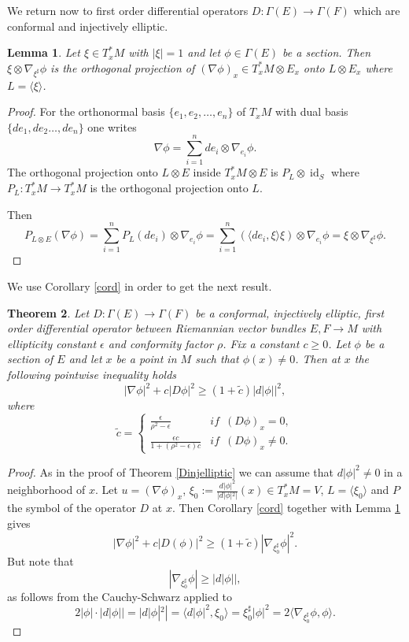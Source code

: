 \documentclass[12pt]{amsart} %
\newtheorem{theorem}{Theorem}[section]
\newtheorem{lemma}[theorem]{Lemma}
\theoremstyle{definition}
\numberwithin{equation}{section}
\DeclareMathOperator{\id}{id}
\newcommand{\ra}{\rightarrow}
\begin{document}
We return now to first order differential operators $D:\Gamma(E)\ra \Gamma(F)$ which are conformal and injectively elliptic.  
\begin{lemma} \label{cord2} Let $\xi\in T^*_xM$ with $|\xi|=1$ and let $\phi\in \Gamma(E)$ be a section. Then $\xi\otimes \nabla_{\xi^{\sharp}}\phi$ is the orthogonal projection of $(\nabla \phi)_x\in T^ *_xM\otimes E_x$ onto $L\otimes E_x$ where $L=\langle \xi\rangle$. 
\end{lemma}
\begin{proof} For the orthonormal basis $\{e_1,e_2,\ldots,e_n\}$ of $T_x M$ with dual basis $\{de_1,de_2\ldots,de_n\}$ one writes
\[\nabla \phi=\sum_{i=1}^ n de_i\otimes \nabla_{e_i} \phi . \]
 The orthogonal projection onto $L\otimes E$ inside $T_x^*M\otimes E$ is $P_L\otimes \id_S$ where $P_L:T_x^*M\ra T_x^*M$ is the orthogonal projection onto $L$.

Then
\[P_{L\otimes E}(\nabla \phi)=\sum_{i=1}^ n P_{L}(de_i)\otimes \nabla_{e_i}\phi=\sum_{i= 1}^ n (\langle de_i,\xi\rangle \xi)\otimes \nabla_{e_i}\phi=\xi \otimes\nabla_{\xi^ {\sharp}}\phi.\]
\end{proof}

We use Corollary \ref{cord} in order to get the next result.
\begin{theorem} Let $D :\Gamma(E)\ra \Gamma(F)$ be a conformal, injectively elliptic, first order differential operator between Riemannian vector bundles $E,F \ra M$ with ellipticity constant $\epsilon$ and conformity factor $\rho$. Fix a constant $c\geq 0$. Let $\phi$
be a section of $E$ and let $x$ be a point in $M$ such that $\phi(x)\neq0$.
Then at $x$ the following pointwise inequality holds
\begin{equation}
|\nabla\phi|^{2}+c|D\phi|^{2}\geq\left(1+\tilde{c}\right)|d|\phi||^{2},
\end{equation} 
where
\[
\tilde{c}=\begin{cases}
\frac{\epsilon}{\rho^2-\epsilon} & if\,\,\,\left(D\phi\right)_{x}=0,\\
\frac{\epsilon c}{1+\left(\rho^2-\epsilon\right)c} & if\,\,\,\left(D\phi\right)_{x}\neq0.
\end{cases}
\]
\end{theorem}

\begin{proof} As in the proof of Theorem \ref{Dinjelliptic} we can assume that $d|\phi|^2\neq 0$ in a neighborhood of $x$. Let $u =(\nabla \phi)_x$, $\xi_0:=\frac{d|\phi|^2}{|d|\phi|^2|}(x)\in T^*_xM=V$,  $L=\langle\xi_0\rangle$  and $P$ the symbol of the operator $D$ at $x$. Then Corollary \ref{cord} together with Lemma \ref{cord2} gives
\[ |\nabla \phi|^ 2+ c|D(\phi)|^ 2\geq (1+\tilde{c})|\nabla_{\xi_0^ {\sharp}}\phi|^ 2 .\] 
But note that
\[|\nabla_{\xi_0^ {\sharp}}\phi|\geq|d|\phi|| , \]
as follows from the Cauchy-Schwarz applied to 
 \[ 2|\phi|\cdot|d|\phi||=|d|\phi|^2|=\langle d|\phi|^2,\xi_0\rangle=\xi_0^{\sharp} |\phi|^2=2\langle \nabla_{\xi_0^{\sharp}}\phi,\phi \rangle .
 \]
\end{proof}
\end{document}
